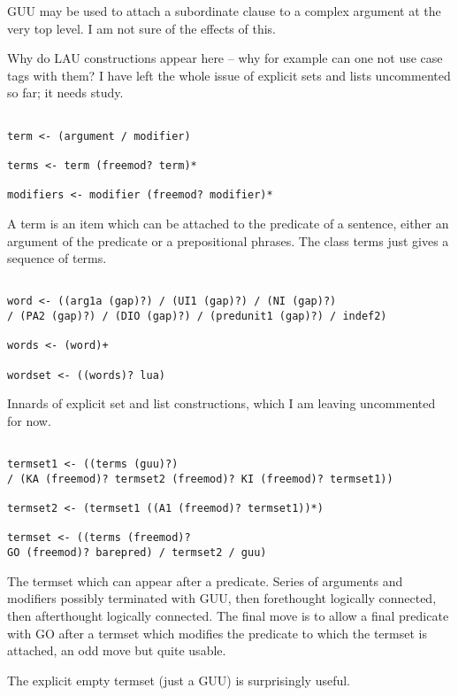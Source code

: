 \documentclass[12pt]{article}
\begin{document}
GUU may be used to attach a subordinate clause to a complex argument at the very top level.  I am not sure of the effects of this.

Why do LAU constructions appear here -- why for example can one not use case tags with them?  I have left the whole issue
of explicit sets and lists uncommented so far; it needs study.

\begin{verbatim}

term <- (argument / modifier)

terms <- term (freemod? term)*

modifiers <- modifier (freemod? modifier)*

\end{verbatim}

A term is an item which can be attached to the predicate of a sentence, either an argument of the predicate or a prepositional phrases.  The class terms just gives a sequence of terms.

\begin{verbatim}

word <- ((arg1a (gap)?) / (UI1 (gap)?) / (NI (gap)?) 
/ (PA2 (gap)?) / (DIO (gap)?) / (predunit1 (gap)?) / indef2)

words <- (word)+

wordset <- ((words)? lua)

\end{verbatim}

Innards of explicit set and list constructions, which I am leaving uncommented for now.

\begin{verbatim}

termset1 <- ((terms (guu)?) 
/ (KA (freemod)? termset2 (freemod)? KI (freemod)? termset1))

termset2 <- (termset1 ((A1 (freemod)? termset1))*)

termset <- ((terms (freemod)? 
GO (freemod)? barepred) / termset2 / guu)

\end{verbatim}

The termset which can appear after a predicate.  Series of arguments and modifiers possibly terminated with GUU,
then forethought logically connected, then afterthought logically connected.  The final move is to allow a final
predicate with GO after a termset which modifies the predicate to which the termset is attached, an odd move but quite usable.

The explicit empty termset (just a GUU) is surprisingly useful.
\end{document}
